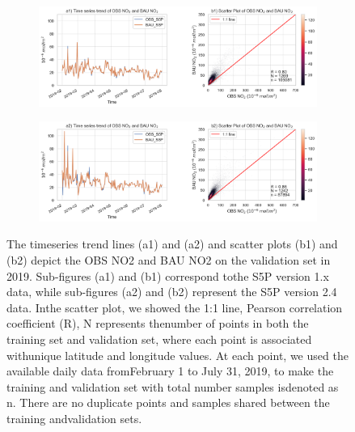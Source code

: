 \begin{figure}[pt]
    \centering
    \begin{subfigure}{\textwidth}
      \centering
      \includegraphics[width=\textwidth]{figs/chap3/figA2-a1b1.png}
    \end{subfigure}

    \begin{subfigure}{\textwidth}
      \centering
      \includegraphics[width=\textwidth]{figs/chap3/figA2-a2b2.png}
    \end{subfigure}
    \caption[Model performance evaluation]{The timeseries trend lines (a1) and (a2) and scatter plots (b1) and (b2) depict the OBS NO2 and BAU NO2 on the validation set in 2019. Sub-figures (a1) and (b1) correspond tothe S5P version 1.x data, while sub-figures (a2) and (b2) represent the S5P version 2.4 data. Inthe scatter plot, we showed the 1:1 line, Pearson correlation coefficient (R), N represents thenumber of points in both the training set and validation set, where each point is associated withunique latitude and longitude values. At each point, we used the available daily data fromFebruary 1 to July 31, 2019, to make the training and validation set with total number samples isdenoted as  n. There are no duplicate points and samples shared between the training andvalidation sets.}
    \label{fig:chap3_figa2}
\end{figure}


